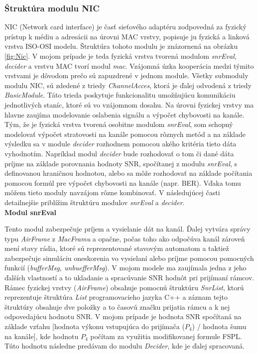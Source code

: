 \documentclass[11pt,twoside,a4paper]{book}
\begin{document}
\subsubsection{Štruktúra modulu NIC}

NIC (Network card interface) je časť sieťového adaptéru zodpovedná za fyzický prístup k médiu a adresácii na úrovni MAC vrstvy, popisuje ju fyzická a linková vrstva ISO-OSI modelu. Štruktúra tohoto modulu je znázornená na obrázku \ref{fig:Nic}. V mojom prípade je teda fyzická vrstva tvorená modulom \textit{snrEval}, \textit{decider} a vrstvu MAC tvorí modul \textit{mac}. Vzájomná úzka kooperácia medzi týmito vrstvami je dôvodom prečo sú zapuzdrené v jednom module. Všetky submoduly modulu NIC, sú zdedené z triedy \textit{ChannelAcces}, ktorá je ďalej odvodená z triedy \textit{BasicModule}. Táto trieda poskytuje funkcionalitu umožňujúcu komunikáciu jednotlivých staníc, ktoré sú vo vzájomnom dosahu. Na úrovni fyzickej vrstvy ma hlavne zaujíma modelovanie oslabenia signálu a výpočet chybovosti na kanále. Tým, že je fyzická vrstva tvorená osobitne modulom \textit{snrEval}, som schopný modelovať výpočet stratovosti na kanále pomocou rôznych metód a na základe výsledku sa v module \textit{decider} rozhodnem pomocou akého kritéria tieto dáta vyhodnotím. Napríklad modul \textit{decider} bude rozhodovať o tom či dané dáta príjme na základe porovnania hodnoty SNR, spočítanej z modulu \textit{snrEval}, s definovanou hraničnou hodnotou, alebo sa môže rozhodovať na základe počítania pomocou formúl pre výpočet chybovosti na kanále (napr. BER). Vďaka tomu môžem tieto moduly navzájom rôzne kombinovať. V následujúcej časti detailnejšie priblížim štruktúru modulov \textit{snrEval} a \textit{decider}. \\


\noindent\textbf{Modul snrEval}

Tento modul zabezpečuje príjem a vysielanie dát na kanál. Ďalej vytvára správy typu \textit{AirFrame} z \textit{MacFramu} a opačne, počas toho ako odpočúva kanál zároveň mení stavy rádia, ktoré sú reprezentované stavovým automatom a taktiež zabezpečuje simuláciu oneskorenia vo vysielaní alebo príjme pomocou pomocných funkcií (\textit{bufferMsg, unbuefferMsg}). V mojom modele ma zaujímala jedna z jeho ďalších vlastností a to ukladanie a spracúvanie SNR hodnôt pri prijímaní rámcov. Rámec fyzickej vrstvy (\textit{AirFrame}) obsahuje pomocnú štruktúru \textit{SnrList}, ktorú reprezentuje štruktúra \textit{List} programovacieho jazyka C++ a záznam tejto štruktúry obsahuje dve položky a to časovú značku prijatia rámcu a k nej odpovedajúcu hodnotu SNR. V mojom prípade je hodnota SNR spočítaná na základe vzťahu [hodnota výkonu vstupujúca do prijímača ($P_{4}$) / hodnota šumu na kanále], kde hodnotu $P_{4}$ počítam za využitia modifikovanej formule FSPL. Túto hodnotu následne predávam do modulu \textit{Decider}, kde je ďalej spracovaná.
\end{document}
